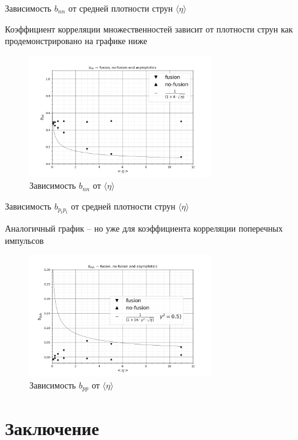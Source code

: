\documentclass[aspectratio=43]{beamer}
\begin{document}
\begin{frame}{Зависимость $b_{nn}$ от средней плотности струн $\langle \eta \rangle$}

	Коэффициент корреляции множественностей зависит от плотности струн как продемонстрировано на графике ниже
	\begin{figure}[H]
		\includegraphics[width=0.7\textwidth]{b_nn}
		\caption*{Зависимость $b_{nn}$ от $\langle \eta \rangle$}
		\label{fig:b_nn}
	\end{figure}

\end{frame}

\begin{frame}{Зависимость $b_{p_tp_t}$ от средней плотности струн $\langle \eta \rangle$}

	Аналогичный график -- но уже для коэффициента корреляции поперечных импульсов
	\begin{figure}[H]
		\includegraphics[width=0.7\textwidth]{b_pp}
		\caption*{Зависимость $b_{pp}$ от $\langle \eta \rangle$}
		\label{fig:b_pp}
	\end{figure}

\end{frame}

\section{Заключение}
\end{document}
